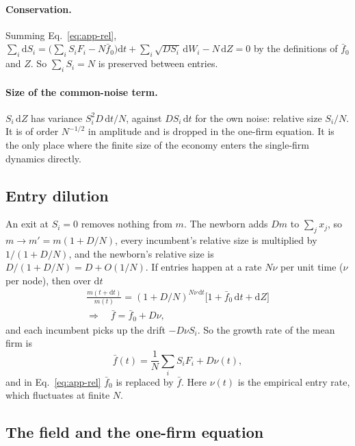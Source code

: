 \documentclass[pre,twocolumn,superscriptaddress,nofootinbib]{revtex4-2}
\newcommand{\fb}{\bar f}
\newcommand{\dd}{\mathrm d}
\begin{document}
\paragraph{Conservation.}  Summing Eq.~\eqref{eq:app-rel},
$\sum_i\dd S_i=\big(\sum_iS_iF_i-N\fb_0\big)\dd t+\sum_i\sqrt{DS_i}\,\dd W_i-N\,\dd Z=0$
by the definitions of $\fb_0$ and $Z$.  So $\sum_iS_i=N$ is preserved between entries.

\paragraph{Size of the common-noise term.}  $S_i\,\dd Z$ has variance $S_i^2D\,\dd t/N$, against $DS_i\,\dd t$
for the own noise: relative size $S_i/N$.  It is of order $N^{-1/2}$ in amplitude and is dropped in the
one-firm equation.  It is the only place where the finite size of the economy enters the single-firm
dynamics directly.

\subsection{Entry dilution}

An exit at $S_i=0$ removes nothing from $m$.  The newborn adds $Dm$ to $\sum_jx_j$, so
$m\to m'=m(1+D/N)$, every incumbent's relative size is multiplied by $1/(1+D/N)$, and the newborn's
relative size is $D/(1+D/N)=D+O(1/N)$.  If entries happen at a rate $N\nu$ per unit time ($\nu$ per
node), then over $\dd t$
\begin{equation}
\begin{gathered}
\frac{m(t+\dd t)}{m(t)}=(1+D/N)^{N\nu\,\dd t}\big[1+\fb_0\,\dd t+\dd Z\big]\\
\Rightarrow\quad \fb=\fb_0+D\nu ,
\end{gathered}
\end{equation}
and each incumbent picks up the drift $-D\nu S_i$.  So the growth rate of the mean firm is
\begin{equation}
\fb(t)=\frac1N\sum_iS_iF_i+D\nu(t),
\label{eq:app-fbar}
\end{equation}
and in Eq.~\eqref{eq:app-rel} $\fb_0$ is replaced by $\fb$.  Here $\nu(t)$ is the empirical entry rate, which fluctuates at finite $N$.

\subsection{The field and the one-firm equation}
\end{document}
